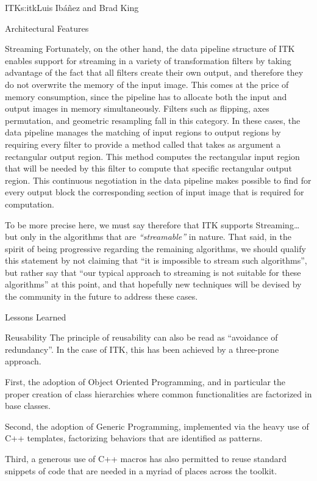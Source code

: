 \begin{aosachapter}{ITK}{s:itk}{Luis Ib\'{a}\~{n}ez and Brad King}
\begin{aosasect1}{Architectural Features}
\begin{aosasect2}{Streaming}
Fortunately, on the other hand, the data pipeline structure of ITK enables
support for streaming in a variety of transformation filters by taking
advantage of the fact that all filters create their own output, and therefore
they do not overwrite the memory of the input image. This comes at the price of
memory consumption, since the pipeline has to allocate both the input and
output images in memory simultaneously. Filters such as flipping, axes
permutation, and geometric resampling fall in this category. In these cases,
the data pipeline manages the matching of input regions to output regions by
requiring every filter to provide a method called
 that takes as argument a rectangular
output region. This method computes the rectangular input region that will be
needed by this filter to compute that specific rectangular output region. This
continuous negotiation in the data pipeline makes possible to find for every
output block the corresponding section of input image that is required for
computation.

To be more precise here, we must say therefore that ITK supports
Streaming\ldots but only in the algorithms that are \emph{``streamable''} in
nature. That said, in the spirit of being progressive regarding the remaining
algorithms, we should qualify this statement by not claiming that ``it is
impossible to stream such algorithms'', but rather say that ``our typical
approach to streaming is not suitable for these algorithms'' at this point, and
that hopefully new techniques will be devised by the community in the future to
address these cases.
\end{aosasect2}

\end{aosasect1}

\begin{aosasect1}{Lessons Learned}

\begin{aosasect2}{Reusability}
The principle of reusability can also be read as ``avoidance of redundancy''.
In the case of ITK, this has been achieved by a three-prone approach.

\begin{aosaitemize}
\item First, the adoption of Object Oriented Programming, and in particular the
proper creation of class hierarchies where common functionalities are
factorized in base classes.
\item Second, the adoption of Generic Programming, implemented via the heavy
use of C++ templates, factorizing behaviors that are identified as patterns.
\item Third, a generous use of C++ macros has also permitted to reuse standard
snippets of code that are needed in a myriad of places across the toolkit.
\end{aosaitemize}


\end{aosasect2}
\end{aosasect1}
\end{aosachapter}
